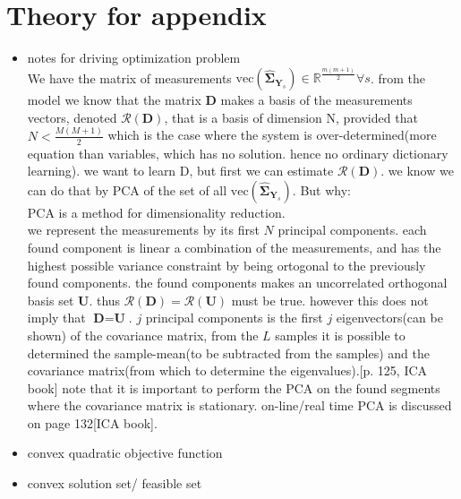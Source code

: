 \section{Theory for appendix}
\begin{itemize}
\item notes for driving optimization problem\\
We have the matrix of measurements $\text{vec}(\widehat{\boldsymbol{\Sigma}}_{\textbf{Y}_s})\in \mathbb{R}^{\frac{m(m+1)}{2}} \forall s$. from the model we know that the matrix $\textbf{D}$ makes a basis of the measurements vectors, denoted $\mathcal{R}(\textbf{D})$, that is a basis of dimension N, provided that $N < \frac{M(M+1)}{2}$ which is the case where the system is over-determined(more equation than variables, which has no solution. hence no ordinary dictionary learning). 
we want to learn D, but first we can estimate $\mathcal{R}(\textbf{D})$. 
we know we can do that by PCA of the set of all $\text{vec}(\widehat{\boldsymbol{\Sigma}}_{\textbf{Y}_s})$. 
But why:\\
PCA is a method for dimensionality reduction. \\
we represent the measurements by its first $N$ principal components. 
each found component is linear a combination of the measurements, and has the highest possible variance constraint by being ortogonal to the previously found components. the found components makes an uncorrelated orthogonal basis set $\textbf{U}$. 
thus  $\mathcal{R}(\textbf{D}) = \mathcal{R}(\textbf{U})$ must be true. however this does not imply that $\textbf{D}=\textbf{U}$. 
$j$ principal components is the first $j$ eigenvectors(can be shown) of the covariance matrix, from the $L$ samples it is possible to determined the sample-mean(to be subtracted from the samples) and the covariance matrix(from which to determine the eigenvalues).[p. 125, ICA book]
note that it is important to perform the PCA on the found segments where the covariance matrix is stationary. on-line/real time PCA is discussed on page 132[ICA book].	 
 

      



\item convex quadratic objective function
\item convex solution set/ feasible set 

\end{itemize}
